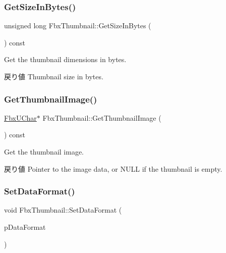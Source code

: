 \subsubsection{\texorpdfstring{Get\+Size\+In\+Bytes()}{GetSizeInBytes()}}
{\footnotesize\ttfamily unsigned long Fbx\+Thumbnail\+::\+Get\+Size\+In\+Bytes (\begin{DoxyParamCaption}{ }\end{DoxyParamCaption}) const}

Get the thumbnail dimensions in bytes. \begin{DoxyReturn}{戻り値}
Thumbnail size in bytes. 
\end{DoxyReturn}
\mbox{\label{class_fbx_thumbnail_aade1213f9f4322aca855cd24de720c14}} 
\subsubsection{\texorpdfstring{Get\+Thumbnail\+Image()}{GetThumbnailImage()}}
{\footnotesize\ttfamily \hyperlink{fbxtypes_8h_a1be3cadf61e76f49142eb83e66ffe8bd}{Fbx\+U\+Char}$\ast$ Fbx\+Thumbnail\+::\+Get\+Thumbnail\+Image (\begin{DoxyParamCaption}{ }\end{DoxyParamCaption}) const}

Get the thumbnail image. \begin{DoxyReturn}{戻り値}
Pointer to the image data, or {\ttfamily N\+U\+LL} if the thumbnail is empty. 
\end{DoxyReturn}
\mbox{\label{class_fbx_thumbnail_aa0da5afd782261ee47d9322bacf9a619}} 
\subsubsection{\texorpdfstring{Set\+Data\+Format()}{SetDataFormat()}}
{\footnotesize\ttfamily void Fbx\+Thumbnail\+::\+Set\+Data\+Format (\begin{DoxyParamCaption}\item[{\hyperlink{class_fbx_thumbnail_a60bdaa7e6f78e26f4a8810c552958a0a}{E\+Data\+Format}}]{p\+Data\+Format }\end{DoxyParamCaption})}

